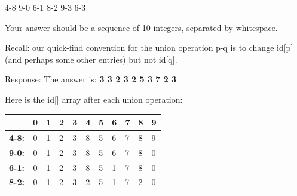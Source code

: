 \documentclass[paper=a4, fontsize=11pt]{scrartcl} %
\numberwithin{equation}{section} %
\numberwithin{figure}{section} %
\numberwithin{table}{section} %
\begin{document}
\begin{center}
4-8 9-0 6-1 8-2 9-3 6-3
\end{center}


Your answer should be a sequence of 10 integers, separated by whitespace.

Recall: our quick-find convention for the union operation p-q is to change id[p]
(and perhaps some other entries) but not id[q].

Response:
The answer is: \textbf{3 3 2 3 2 5 3 7 2 3}

Here is the id[] array after each union operation:
\begin{table}[]
\centering

\label{my-label}
\begin{tabular}{|c|ccllllllll}
\hline
              & \multicolumn{1}{c|}{0} & \multicolumn{1}{c|}{1} & \multicolumn{1}{l|}{\textbf{2}} & \multicolumn{1}{l|}{\textbf{3}} & \multicolumn{1}{l|}{\textbf{4}} & \multicolumn{1}{l|}{\textbf{5}} & \multicolumn{1}{l|}{\textbf{6}} & \multicolumn{1}{l|}{\textbf{7}} & \multicolumn{1}{l|}{\textbf{8}} & \multicolumn{1}{l|}{\textbf{9}} \\ \hline
\textbf{4-8:} & 0                      & 1                      & 2                               & 3                               & 8                               & 5                               & 6                               & 7                               & 8                               & 9                               \\ \cline{1-1}
\textbf{9-0:} & 0                      & 1                      & 2                               & 3                               & 8                               & 5                               & 6                               & 7                               & 8                               & 0                               \\ \cline{1-1}
\textbf{6-1:} & 0                      & 1                      & 2                               & 3                               & 8                               & 5                               & 1                               & 7                               & 8                               & 0                               \\ \cline{1-1}
\textbf{8-2:} & 0                      & 1                      & 2                               & 3                               & 2                               & 5                               & 1                               & 7                               & 2                               & 0                               \\ \cline{1-1}

\end{tabular}
\end{table}
\end{document}
